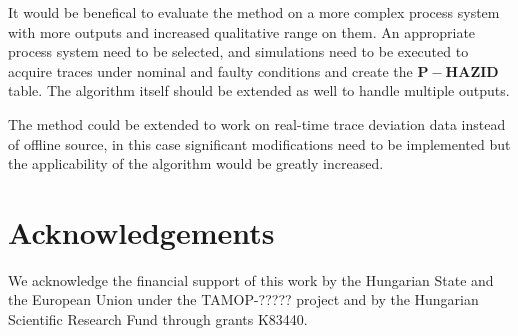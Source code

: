 \documentclass[conference]{IEEEtran}
\begin{document}
It would be benefical to evaluate the method on a more complex process system with more outputs and increased qualitative range on them. An appropriate process system need to be selected, and simulations need to be executed to acquire traces under nominal and faulty conditions and create the $\mathbf{P-HAZID}$ table. The algorithm itself should be extended as well to handle multiple outputs.

The method could be extended to work on real-time trace deviation data instead of offline source, in this case significant modifications need to be implemented but the applicability of the algorithm would be greatly increased.

\section{Acknowledgements} 
We acknowledge the financial support of this work by the Hungarian State and the European Union under the TAMOP-????? project and by the Hungarian Scientific Research Fund through
grants K83440.


\end{document}

